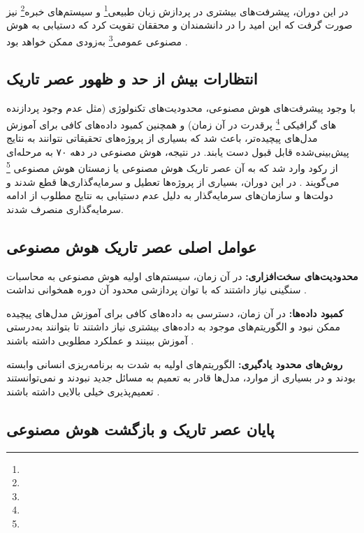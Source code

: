 در این دوران، پیشرفت‌های بیشتری در پردازش زبان طبیعی\footnote{} و سیستم‌های خبره\footnote{} نیز صورت گرفت که این امید را در دانشمندان و محققان تقویت کرد که دستیابی به هوش مصنوعی عمومی\footnote{} به‌زودی ممکن خواهد بود \cite{feigenbaum1983handbook}.


\subsection{انتظارات بیش از حد و ظهور عصر تاریک}

با وجود پیشرفت‌های هوش مصنوعی، محدودیت‌های تکنولوژی (مثل عدم وجود  پردازنده های گرافیکی  \footnote{} پرقدرت در آن زمان) و همچنین کمبود داده‌های کافی برای آموزش مدل‌های پیچیده‌تر، باعث شد که بسیاری از پروژه‌های تحقیقاتی نتوانند به نتایج پیش‌بینی‌شده قابل قبول دست یابند. در نتیجه، هوش مصنوعی در دهه ۷۰ به مرحله‌ای از رکود وارد شد که به آن عصر تاریک هوش مصنوعی یا زمستان هوش مصنوعی \footnote{} می‌گویند \cite{lighthill1973artificial,crevier1993ai}. در این دوران، بسیاری از پروژه‌ها تعطیل و سرمایه‌گذاری‌ها قطع شدند و دولت‌ها و سازمان‌های سرمایه‌گذار به دلیل عدم دستیابی به نتایج مطلوب از ادامه سرمایه‌گذاری منصرف شدند.


\subsection{عوامل اصلی عصر تاریک هوش مصنوعی}


\textbf{محدودیت‌های سخت‌افزاری:} در آن زمان، سیستم‌های اولیه هوش مصنوعی به محاسبات سنگینی نیاز داشتند که با توان پردازشی محدود آن دوره همخوانی نداشت \cite{nilsson2010quest}.

\textbf{کمبود داده‌ها:} در آن زمان، دسترسی به داده‌های کافی برای آموزش مدل‌های پیچیده ممکن نبود و الگوریتم‌های موجود به داده‌های بیشتری نیاز داشتند تا بتوانند به‌درستی آموزش ببینند و عملکرد مطلوبی داشته باشند \cite{crevier1993ai}.

\textbf{روش‌های محدود یادگیری:} الگوریتم‌های اولیه به شدت به برنامه‌ریزی انسانی وابسته بودند و در بسیاری از موارد، مدل‌ها قادر به تعمیم به مسائل جدید نبودند و نمی‌توانستند تعمیم‌پذیری خیلی بالایی داشته باشند \cite{russell2016artificial}.



\subsection{پایان عصر تاریک و بازگشت هوش مصنوعی}

